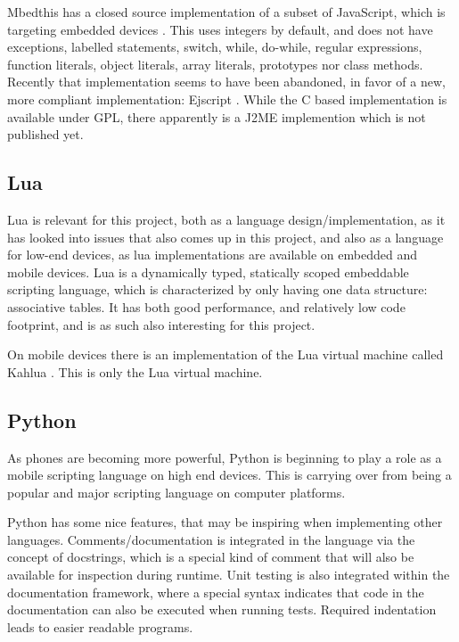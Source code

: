 \documentclass[11pt]{report}
\begin{document}
Mbedthis has a closed source implementation of a subset of JavaScript, which is targeting embedded devices \cite{mbedthis}. This uses integers by default, and does not have exceptions, labelled statements, switch, while, do-while, regular expressions, function literals, object literals, array literals, prototypes nor class methods.
Recently that implementation seems to have been abandoned, in favor of a new, more compliant implementation: Ejscript \cite{ejscript}.
While the C based implementation is available under GPL, there apparently is a J2ME implemention which is not published yet.

\subsection{Lua}
Lua is relevant for this project, both as a language design/implementation, as it has looked into issues that also comes up in this project, and also as a language for low-end devices, as lua implementations are available on embedded and mobile devices.
Lua is a dynamically typed, statically scoped embeddable scripting language, which is characterized by only having one data structure: associative tables.
It has both good performance, and relatively low code footprint, and is as such also interesting for this project.

On mobile devices there is an implementation of the Lua virtual machine called Kahlua \cite{kahlua}.
This is only the Lua virtual machine.

\subsection{Python}
As phones are becoming more powerful, Python is beginning to play a role as a mobile scripting language on high end devices. This is carrying over from being a popular and major scripting language on computer platforms.

Python has some nice features, that may be inspiring when implementing other languages. Comments/documentation is integrated in the language via the concept of docstrings, which is a special kind of comment that will also be available for inspection during runtime. Unit testing is also integrated within the documentation framework, where a special syntax indicates that code in the documentation can also be executed when running tests.
Required indentation leads to easier readable programs.
\end{document}
